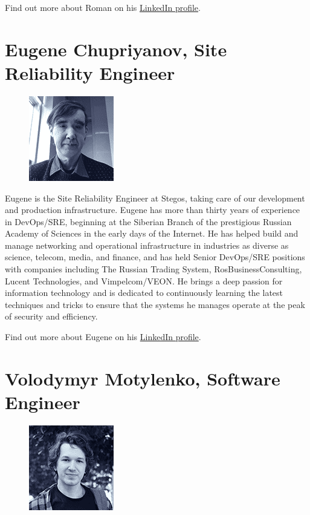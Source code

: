 \documentclass[8pt,fleqn,openany]{book}
\begin{document}
{{			Find out more about Roman on his \href{https://linkedin.com/in/roman.tsisyk}{LinkedIn profile}.
		}
		
		\section{Eugene Chupriyanov, Site Reliability Engineer}
		
		{
			\setlength\intextsep{0pt}
			\begin{figure}
				\includegraphics{images/team/team-5.png}
			\end{figure}
			
			Eugene is the Site Reliability Engineer at Stegos, taking care of our development and production infrastructure. Eugene has more than thirty years of experience in DevOps/SRE, beginning at the Siberian Branch of the prestigious Russian Academy of Sciences in the early days of the Internet. He has helped build and manage networking and operational infrastructure in industries as diverse as science, telecom, media, and finance, and has held Senior DevOps/SRE positions with companies including The Russian Trading System, RosBusinessConsulting, Lucent Technologies, and Vimpelcom/VEON. He brings a deep passion for information technology and is dedicated to continuously learning the latest techniques and tricks to ensure that the systems he manages operate at the peak of security and efficiency. 
			
			Find out more about Eugene on his \href{https://www.linkedin.com/in/eugenechupriyanov/}{LinkedIn profile}.
		}
		
		\section{Volodymyr Motylenko, Software Engineer}
		
		{
			\setlength\intextsep{0pt}
			\begin{figure}
				\includegraphics{images/team/team-6.png}
			\end{figure}
			
}}
\end{document}
